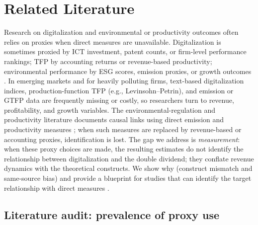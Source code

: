 
\section{Related Literature}
\label{sec:related}

Research on digitalization and environmental or productivity outcomes often relies on proxies when direct measures are unavailable. Digitalization is sometimes proxied by ICT investment, patent counts, or firm-level performance rankings; TFP by accounting returns or revenue-based productivity; environmental performance by ESG scores, emission proxies, or growth outcomes \citep{WANG2026128596, XUE2025108398, GONG2026102241, XU2025104647}. In emerging markets and for heavily polluting firms, text-based digitalization indices, production-function TFP (e.g., Levinsohn--Petrin), and emission or GTFP data are frequently missing or costly, so researchers turn to revenue, profitability, and growth variables. The environmental-regulation and productivity literature documents causal links using direct emission and productivity measures \citep{ALBRIZIO2017209, WANG201854, BENATTI2024102995, SHI2018187, SEMRAU2026103324, LI2025103224}; when such measures are replaced by revenue-based or accounting proxies, identification is lost. The gap we address is \emph{measurement}: when these proxy choices are made, the resulting estimates do not identify the relationship between digitalization and the double dividend; they conflate revenue dynamics with the theoretical constructs. We show why (construct mismatch and same-source bias) and provide a blueprint for studies that can identify the target relationship with direct measures \citep{WANG2026128596, ZHANG2026116098, LU2026105596, YU2026109274, MA2026103210}.

\subsection{Literature audit: prevalence of proxy use}

